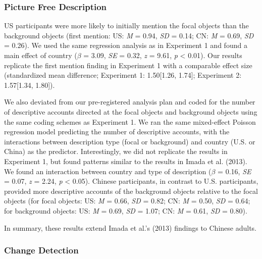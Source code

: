 \documentclass[
  man,floatsintext]{apa6}
\begin{document}
\hypertarget{picture-free-description-2}{%
\subsubsection{Picture Free Description}\label{picture-free-description-2}}

US participants were more likely to initially mention the focal objects than the background objects (first mention: US: \emph{M} = 0.94, \emph{SD} = 0.14; CN: \emph{M} = 0.69, \emph{SD} = 0.26). We used the same regression analysis as in Experiment 1 and found a main effect of country (\(\beta\) = 3.09, \emph{SE} = 0.32, \emph{z} = 9.61, \emph{p} \textless{} 0.01). Our results replicate the first mention finding in Experiment 1 with a comparable effect size (standardized mean difference; Experiment 1: 1.50{[}1.26, 1.74{]}; Experiment 2: 1.57{[}1.34, 1.80{]}).

We also deviated from our pre-registered analysis plan and coded for the number of descriptive accounts directed at the focal objects and background objects using the same coding schemes as Experiment 1. We ran the same mixed-effect Poisson regression model predicting the number of descriptive accounts, with the interactions between description type (focal or background) and country (U.S. or China) as the predictor. Interestingly, we did not replicate the results in Experiment 1, but found patterns similar to the results in Imada et al. (2013). We found an interaction between country and type of description (\(\beta\) = 0.16, \emph{SE} = 0.07, \emph{z} = 2.24, \emph{p} \textless{} 0.05). Chinese participants, in contrast to U.S. participants, provided more descriptive accounts of the background objects relative to the focal objects (for focal objects: US: \emph{M} = 0.66, \emph{SD} = 0.82; CN: \emph{M} = 0.50, \emph{SD} = 0.64; for background objects: US: \emph{M} = 0.69, \emph{SD} = 1.07; CN: \emph{M} = 0.61, \emph{SD} = 0.80).

In summary, these results extend Imada et al.'s (2013) findings to Chinese adults.

\hypertarget{change-detection-1}{%
\subsubsection{Change Detection}\label{change-detection-1}}
\end{document}
